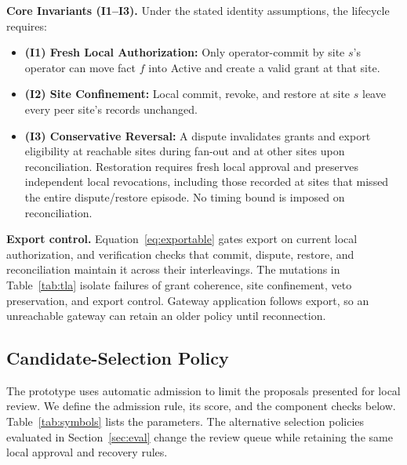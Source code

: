 \documentclass[journal]{IEEEtran}
\theoremstyle{definition}
\begin{document}
\textbf{Core Invariants (I1--I3).} Under the stated identity assumptions, the lifecycle requires:
\begin{itemize}
\item \textbf{(I1) Fresh Local Authorization:} Only operator-commit by site $s$'s operator can move fact $f$ into Active and create a valid grant at that site.
\item \textbf{(I2) Site Confinement:} Local commit, revoke, and restore at site $s$ leave every peer site's records unchanged.
\item \textbf{(I3) Conservative Reversal:} A dispute invalidates grants and export eligibility at reachable sites during fan-out and at other sites upon reconciliation. Restoration requires fresh local approval and preserves independent local revocations, including those recorded at sites that missed the entire dispute/restore episode. No timing bound is imposed on reconciliation.
\end{itemize}

\textbf{Export control.} Equation~\ref{eq:exportable} gates export on current local authorization, and verification checks that commit, dispute, restore, and reconciliation maintain it across their interleavings. The mutations in Table~\ref{tab:tla} isolate failures of grant coherence, site confinement, veto preservation, and export control. Gateway application follows export, so an unreachable gateway can retain an older policy until reconnection.

\subsection{Candidate-Selection Policy}
\label{sec:scoring}
The prototype uses automatic admission to limit the proposals presented for local review. We define the admission rule, its score, and the component checks below. Table~\ref{tab:symbols} lists the parameters. The alternative selection policies evaluated in Section~\ref{sec:eval} change the review queue while retaining the same local approval and recovery rules.
\end{document}
